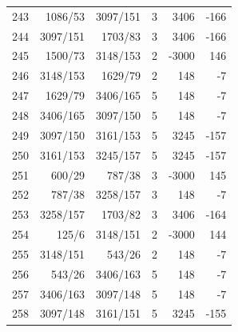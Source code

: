 \documentclass[11pt,a4paper]{article}
\begin{document}
\begin{minipage}[t]{.49\linewidth}
\begin{tabular*}{\linewidth}{@{}r@{\extracolsep{\fill}}rrrrr@{}}
243 & 1086/53 & 3097/151 & 3 & 3406 & -166\\
244 & 3097/151 & 1703/83 & 3 & 3406 & -166\\
245 & 1500/73 & 3148/153 & 2 & -3000 & 146\\
246 & 3148/153 & 1629/79 & 2 & 148 & -7\\
247 & 1629/79 & 3406/165 & 5 & 148 & -7\\
248 & 3406/165 & 3097/150 & 5 & 148 & -7\\
249 & 3097/150 & 3161/153 & 5 & 3245 & -157\\
250 & 3161/153 & 3245/157 & 5 & 3245 & -157\\
251 & 600/29 & 787/38 & 3 & -3000 & 145\\
252 & 787/38 & 3258/157 & 3 & 148 & -7\\
253 & 3258/157 & 1703/82 & 3 & 3406 & -164\\
254 & 125/6 & 3148/151 & 2 & -3000 & 144\\
255 & 3148/151 & 543/26 & 2 & 148 & -7\\
256 & 543/26 & 3406/163 & 5 & 148 & -7\\
257 & 3406/163 & 3097/148 & 5 & 148 & -7\\
258 & 3097/148 & 3161/151 & 5 & 3245 & -155\\
\bottomrule\end{tabular*}\end{minipage}\par
\clearpage
{}\par\vspace{4pt}
\end{document}

